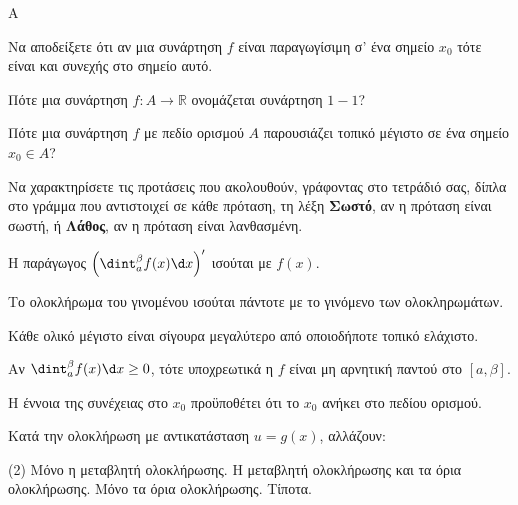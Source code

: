 \begin{thema}{A}
\begin{erwthma}
    \item Να αποδείξετε ότι αν μια συνάρτηση $f$ είναι παραγωγίσιμη σ’ ένα σημείο {$ x_0 $} τότε είναι και συνεχής στο σημείο αυτό.
    \item Πότε μια συνάρτηση $f:A\to\mathbb{R}$ ονομάζεται συνάρτηση $1-1$?
    \item Πότε μια συνάρτηση $f$ με πεδίο ορισμού $A$ παρουσιάζει τοπικό μέγιστο σε ένα σημείο $x_0\in A$?
    \item Να χαρακτηρίσετε τις προτάσεις που ακολουθούν, γράφοντας στο τετράδιό σας, δίπλα στο γράμμα που αντιστοιχεί σε κάθε πρόταση, τη λέξη \textbf{Σωστό}, αν η πρόταση είναι σωστή, ή \textbf{Λάθος}, αν η πρόταση είναι λανθασμένη.
    \begin{alist}
        \item Η παράγωγος $\left(\dint_a^\beta f(x) \d x \right)'$ ισούται με $ f(x)$.
        \item Το ολοκλήρωμα του γινομένου ισούται πάντοτε με το γινόμενο των ολοκληρωμάτων.
        \item Κάθε ολικό μέγιστο είναι σίγουρα μεγαλύτερο από οποιοδήποτε τοπικό ελάχιστο.
        \item Αν $\dint_a^\beta f(x) \d x \ge 0$, τότε υποχρεωτικά η $f$ είναι μη αρνητική παντού στο $[a, \beta]$.
        \item Η έννοια της συνέχειας στο $x_0$ προϋποθέτει ότι το $x_0$ ανήκει στο πεδίου ορισμού.
    \end{alist}
    \item Κατά την ολοκλήρωση με αντικατάσταση $u = g(x)$, αλλάζουν:
    \begin{tasks}[label=\let\textdexiakeraia\relax\alph*.](2)
        \task Μόνο η μεταβλητή ολοκλήρωσης.
        \task H μεταβλητή ολοκλήρωσης και τα όρια ολοκλήρωσης.
        \task Μόνο τα όρια ολοκλήρωσης.
        \task Τίποτα.
    \end{tasks}
\end{erwthma}
\end{thema}


